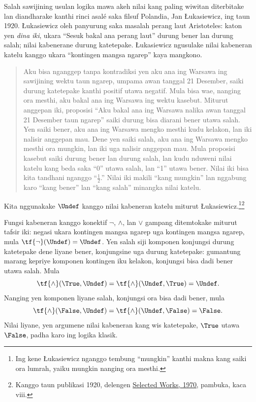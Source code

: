 \documentclass[../../../include/open-logic-section]{subfiles}
\begin{document}


Salah sawijining usulan logika mawa akeh nilai kang paling wiwitan
diterbitake lan diandharake kanthi rinci asalé saka filsuf Polandia,
Jan \L ukasiewicz, ing taun 1920. \L ukasiewicz oleh panyurung saka
masalah perang laut Aristoteles: katon yen \emph{dina iki}, ukara
``Sesuk bakal ana perang laut'' durung bener lan durung salah;
nilai kabenerane durung katetepake. \L ukasiewicz ngusulake
nilai kabeneran katelu kanggo ukara ``kontingen mangsa ngarep''
kaya mangkono.
\begin{quote}
Aku bisa nganggep tanpa kontradiksi yen aku ana ing Warsawa ing
sawijining wektu taun ngarep, umpama awan tanggal 21 Desember,
saiki durung katetepake kanthi positif utawa negatif. Mula bisa
wae, nanging ora mesthi, aku bakal ana ing Warsawa ing wektu
kasebut. Miturut anggepan iki, proposisi ``Aku bakal ana ing
Warsawa nalika awan tanggal 21 Desember taun ngarep'' saiki
durung bisa diarani bener utawa salah. Yen saiki bener, aku ana
ing Warsawa mengko mesthi kudu kelakon, lan iki nalisir
anggepan mau. Dene yen saiki salah, aku ana ing Warsawa mengko
mesthi ora mungkin, lan iki uga nalisir anggepan mau. Mula
proposisi kasebut saiki durung bener lan durung salah, lan
kudu nduweni nilai katelu kang beda saka ``0'' utawa salah,
lan ``1'' utawa bener. Nilai iki bisa kita tandhani nganggo
``$\frac{1}{2}$.'' Nilai iki makili ``kang mungkin'' lan
nggabung karo ``kang bener'' lan ``kang salah'' minangka
nilai katelu.
\end{quote}
Kita nggunakake $\Undef$ kanggo nilai kabeneran katelu
miturut \L ukasiewicz.\footnote{Ing kene \L ukasiewicz
nganggo tembung ``mungkin'' kanthi makna kang saiki ora lumrah,
yaiku mungkin nanging ora mesthi.}\footnote{Kanggo taun publikasi 1920, delengen \href{https://www.scribd.com/document/359602256/J-Lukasiewicz-Selected-Works-L-Borkowski-Editor}{Selected Works, 1970}, pambuka, kaca viii.}

Fungsi kabeneran kanggo konektif $\lnot$, $\land$, lan $\lor$
gampang ditemtokake miturut tafsir iki: negasi ukara
kontingen mangsa ngarep uga kontingen mangsa ngarep, mula
$\tf{\lnot}(\Undef) = \Undef$. Yen salah siji komponen
konjungsi durung katetepake dene liyane bener, konjungsine
uga durung katetepake: gumantung marang kepriye komponen
kontingen iku kelakon, konjungsi bisa dadi bener utawa salah.
Mula \[
    \tf{\land}(\True, \Undef) =
\tf{\land}(\Undef, \True) =
\Undef.
\]
Nanging yen komponen liyane salah, konjungsi ora bisa dadi
bener, mula \[\tf{\land}(\False, \Undef) =
\tf{\land}(\Undef, \False) = \False.\]
Nilai liyane, yen argumene nilai kabeneran kang wis katetepake,
$\True$ utawa $\False$, padha karo ing logika klasik.
\end{document}
